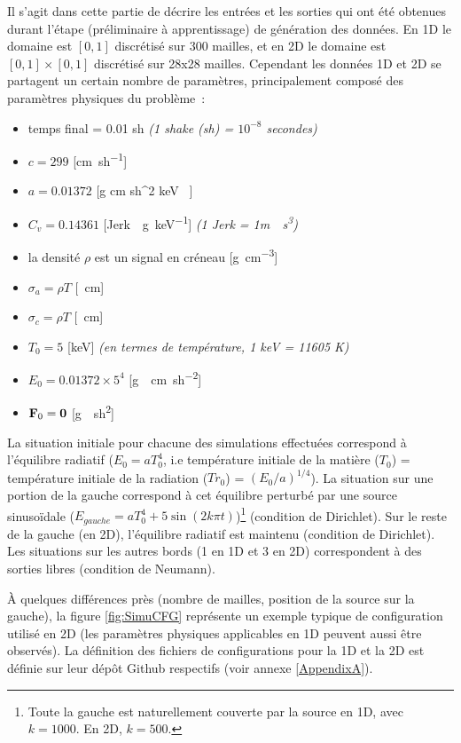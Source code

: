 Il s'agit dans cette partie de décrire les entrées et les sorties qui ont été obtenues durant l'étape (préliminaire à apprentissage) de génération des données. En 1D le domaine est $[0,1]$ discrétisé sur 300 mailles, et en 2D le domaine est $[0,1] \times [0,1]$ discrétisé sur 28x28 mailles. Cependant les données 1D et 2D se partagent un certain nombre de paramètres, principalement composé des paramètres physiques du problème :
\begin{itemize}
  \item temps final = 0.01 \si{sh} \textit{(1 shake (\si{sh}) = $10^{-8}$ secondes)}
  \item $c = 299$ [\si{\cm \per sh}]
  \item $a = 0.01372$ [\si{g \per cm \per sh^2  \per keV }]
  \item $C_v = 0.14361$ [\si{Jerk \per\g \per keV}] \textit{(1 \si{Jerk} = 1\si{m \per \s\cubed})}
  \item la densité $\rho$ est un signal en créneau [\si{\g\per\cm\cubed}]
  \item $\sigma_a = \rho T$ [\si{\per\cm}]
  \item $\sigma_c = \rho T$ [\si{\per\cm}]
  \item $T_0 = 5$ [\si{keV}] \textit{(en termes de température, 1 \si{keV} = 11605 \si{K})}
  \item $E_0 = 0.01372\times 5^4$ [\si{g \per \cm \per sh^2}]
  \item $\mathbf{F}_0 = \mathbf{0}$ [\si{g \per sh^2}]
\end{itemize}

La situation initiale pour chacune des simulations effectuées correspond à l'équilibre radiatif ($E_0=aT_0^4$, i.e température initiale de la matière ($T_0$) = température initiale de la radiation ($Tr_0$) = $(E_0/a)^{1/4}$). La situation sur une portion de la gauche correspond à cet équilibre perturbé par une source sinusoïdale ($ E_{gauche} = aT_{0}^4 + 5 \sin (2 k \pi t) $)\footnote{Toute la gauche est naturellement couverte par la source en 1D, avec $k=1000$. En 2D, $k=500$.} (condition de Dirichlet). Sur le reste de la gauche (en 2D), l'équilibre radiatif est maintenu (condition de Dirichlet). Les situations sur les autres bords (1 en 1D et 3 en 2D) correspondent à des sorties libres (condition de Neumann).

À quelques différences près (nombre de mailles, position de la source sur la gauche), la figure \ref{fig:SimuCFG} représente un exemple typique de configuration utilisé en 2D (les paramètres physiques applicables en 1D peuvent aussi être observés). La définition des fichiers de configurations pour la 1D et la 2D est définie sur leur dépôt Github respectifs (voir annexe \ref{AppendixA}).


